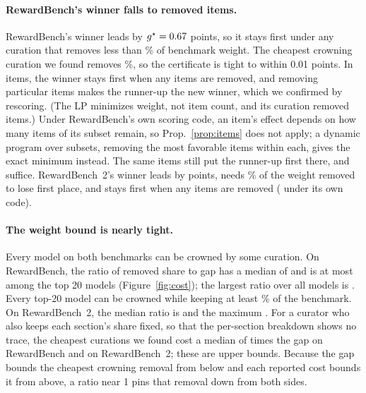 \documentclass[11pt]{article}
\begin{document}
\paragraph{RewardBench's winner falls to \OneCertItems{} removed items.} RewardBench's winner leads by $g^\star=0.67$ points, so it stays first under any curation that removes less than \OneCertGap\% of benchmark weight. The cheapest crowning curation we found removes \OneCertLP\%, so the certificate is tight to within 0.01 points. In items, the winner stays first when any \OneCertItemsSafe{} items are removed, and removing \OneCertItems{} particular items makes the runner-up the new winner, which we confirmed by rescoring. (The LP minimizes weight, not item count, and its curation removed \OneCertLPItems{} items.) Under RewardBench's own scoring code, an item's effect depends on how many items of its subset remain, so Prop.~\ref{prop:items} does not apply; a dynamic program over subsets, removing the most favorable items within each, gives the exact minimum instead. The same \OneCertItems{} items still put the runner-up first there, and \OneOffItems{} suffice. RewardBench~2's winner leads by \TwoCertGap{} points, needs \TwoCertLP\% of the weight removed to lose first place, and stays first when any \TwoCertItemsSafe{} items are removed (\TwoOffItemsSafe{} under its own code).

\paragraph{The weight bound is nearly tight.} Every model on both benchmarks can be crowned by some curation. On RewardBench, the ratio of removed share to gap has a median of \OneFreeRatioMedian{} and is at most \OneFreeRatioTopTwentyMax{} among the top 20 models (Figure~\ref{fig:cost}); the largest ratio over all models is \OneFreeRatioMax{}. Every top-20 model can be crowned while keeping at least \OneFreeKeepTopTwentyMin\% of the benchmark. On RewardBench~2, the median ratio is \TwoFreeRatioMedian{} and the maximum \TwoFreeRatioMax{}. For a curator who also keeps each section's share fixed, so that the per-section breakdown shows no trace, the cheapest curations we found cost a median of \OneStratRatioMedian{} times the gap on RewardBench and \TwoStratRatioMedian{} on RewardBench~2; these are upper bounds. Because the gap bounds the cheapest crowning removal from below and each reported cost bounds it from above, a ratio near 1 pins that removal down from both sides.

\begin{table}[t]
\centering\small

\caption{Possible winners $|P(\delta)|$ at curation budget $\delta$ (\% of benchmark weight). In a range $a$--$b$, $a$ models have a verified curation that removes at most $\delta$ and $b$ models are within $\delta$ of the winner (Prop.~\ref{prop:floor}). A single number means $a=b$. RewardBench's winner is not certified at a 1\% budget; RewardBench~2's is certified up to 5\%.}
\label{tab:plausible}
\end{table}
\end{document}
